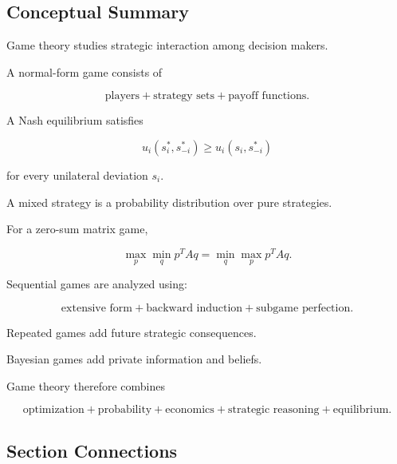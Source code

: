 \subsection{Conceptual Summary}
\label{subsec:game-theory-summary}

Game theory studies strategic interaction among decision makers.

A normal-form game consists of

\[
\boxed{
\text{players}
+
\text{strategy sets}
+
\text{payoff functions}.
}
\]

A Nash equilibrium satisfies

\[
\boxed{
u_i(s_i^*,s_{-i}^*)
\geq
u_i(s_i,s_{-i}^*)
}
\]

for every unilateral deviation \(s_i\).

A mixed strategy is a probability distribution over pure strategies.

For a zero-sum matrix game,

\[
\boxed{
\max_p
\min_q
p^TAq
=
\min_q
\max_p
p^TAq.
}
\]

Sequential games are analyzed using:

\[
\boxed{
\text{extensive form}
+
\text{backward induction}
+
\text{subgame perfection}.
}
\]

Repeated games add future strategic consequences.

Bayesian games add private information and beliefs.

Game theory therefore combines

\[
\boxed{
\text{optimization}
+
\text{probability}
+
\text{economics}
+
\text{strategic reasoning}
+
\text{equilibrium}.
}
\]

\subsection{Section Connections}
\label{subsec:game-theory-connections}


